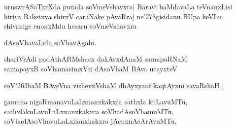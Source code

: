 \begin{entry}
\begin{shl}
uruswrASaTxrXda purada soVmeVshavxra| Baravi baMdavaLa teVnanxLisi\\
hiriya Baketxya shirxV caraNake pAvaRra| ne\char'273gisidanu BUpa
keVLu.\\
shivanige enonxMdu hesaru soVmeVshavxra
\end{shl}
\end{entry}

\begin{entry}

\gl{}
\begin{shl}
dAsoVhavaLidu soVhavAgalu.
\end{shl}
\end{entry}

\begin{entry}
\begin{shl}
shariVrAdi padAthARMshacx dakAvxdAnaM samapaRNaM\\
samapayxR soVhamasimxVti dAsoVhaM BAva ucayxteV
\end{shl}

\begin{shl}
soV{\char'263}haM BAveVna vishevxVshaM dhAyxyanf kaqtAyxni savaRshaH |
\end{shl}
\end{entry}

\begin{entry}
\gl{}
\begin{shl}
gamana nigaRmanavuLaLxnanxkakxra sathxla kuLavuMTu,\\
sathxlakuLavuLaLxnanxkakxra soVhadAsoVhamuMTu,\\
soVhadAsoVhavuLaLxnanxkakxra jAcnxnAcArAvuMTu,\\
\end{shl}
\end{entry}

